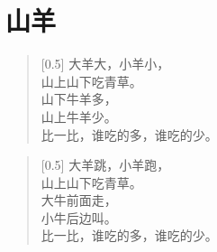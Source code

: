 \documentclass[12pt,UTF-8,openany]{ctexbook}
\begin{document}
\clearpage

\begin{center}
    
\end{center}


\hanzibox{}\hanzibox{}\hanzibox{}\hanzibox{}\hspace{1em}\hanzibox{}\hanzibox{}\hanzibox{}\hanzibox{}

\hanzibox{}\hanzibox{}\hanzibox{}\hanzibox{}\hspace{1em}\hanzibox{}\hanzibox{}\hanzibox{}\hanzibox{}

\hanzibox{}\hanzibox{}\hanzibox{}\hanzibox{}\hspace{1em}\hanzibox{}\hanzibox{}\hanzibox{}\hanzibox{}

\hanzibox{}\hanzibox{}\hanzibox{}\hanzibox{}\hspace{1em}




\chapter{山羊}

\begin{large}
    
    \begin{verse}[0.5\linewidth]
        大羊大，小羊小， \\
        山上山下吃青草。 \\
        山下牛羊多， \\
        山上牛羊少。 \\
        比一比，谁吃的多，谁吃的少。
    \end{verse}
    
    
    \begin{verse}[0.5\linewidth]
        大羊跳，小羊跑， \\
        山上山下吃青草。 \\
        大牛前面走， \\
        小牛后边叫。 \\
        比一比，谁吃的多，谁吃的少。
    \end{verse}
    
\end{large}


\clearpage

\begin{center}
    
\end{center}
\end{document}
